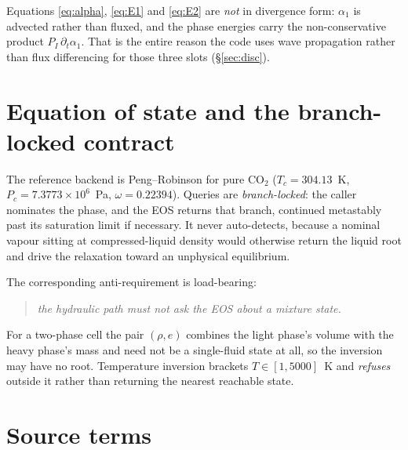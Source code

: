 \documentclass[11pt,a4paper]{article}
\begin{document}
Equations \eqref{eq:alpha}, \eqref{eq:E1} and \eqref{eq:E2} are
\emph{not} in divergence form: $\alpha_1$ is advected rather than fluxed, and
the phase energies carry the non-conservative product
$P_{\!I}\,\partial_t\alpha_1$.  That is the entire reason the code uses
wave propagation rather than flux differencing for those three slots
(\S\ref{sec:disc}).

\section{Equation of state and the branch-locked contract}

The reference backend is Peng--Robinson for pure CO$_2$
($T_c=304.13$~K, $P_c=7.3773\times10^6$~Pa, $\omega=0.22394$).  Queries are
\emph{branch-locked}: the caller nominates the phase, and the EOS returns that
branch, continued metastably past its saturation limit if necessary.  It never
auto-detects, because a nominal vapour sitting at compressed-liquid density
would otherwise return the liquid root and drive the relaxation toward an
unphysical equilibrium.

The corresponding anti-requirement is load-bearing:
\begin{quote}
  \emph{the hydraulic path must not ask the EOS about a mixture state.}
\end{quote}
For a two-phase cell the pair $(\rho,e)$ combines the light phase's volume
with the heavy phase's mass and need not be a single-fluid state at all, so the
inversion may have no root.  Temperature inversion brackets
$T\in[1,5000]$~K and \emph{refuses} outside it rather than returning the
nearest reachable state.

\section{Source terms}
\label{sec:sources}
\end{document}
